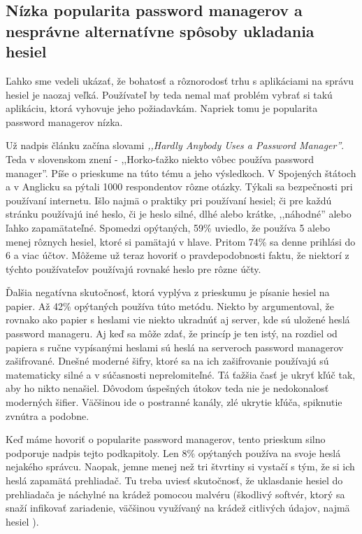 \subsection{Nízka popularita password managerov a nesprávne alternatívne spôsoby ukladania hesiel}
Ľahko sme vedeli ukázať, že bohatosť a rôznorodosť trhu s aplikáciami na správu hesiel je naozaj veľká. Používateľ by teda nemal mať problém vybrať si takú aplikáciu, ktorá vyhovuje jeho požiadavkám. Napriek tomu je popularita password managerov nízka. 
\par Už nadpis článku \cite{19} začína slovami \textit{,,Hardly Anybody Uses a Password Manager''}. Teda v slovenskom znení - ,,Horko-ťažko niekto vôbec používa password manager''. Píše o prieskume na túto tému a jeho výsledkoch. V Spojených štátoch a v Anglicku sa pýtali 1000 respondentov rôzne otázky. Týkali sa bezpečnosti pri používaní internetu. Išlo najmä o praktiky pri používaní hesiel; či pre každú stránku používajú iné heslo, či je heslo silné, dlhé alebo krátke, ,,náhodné'' alebo ľahko zapamätateľné. Spomedzi opýtaných, 59\% uviedlo, že používa 5 alebo menej rôznych hesiel, ktoré si pamätajú v hlave. Pritom 74\% sa denne prihlási do 6 a viac účtov. Môžeme už teraz hovoriť o pravdepodobnosti faktu, že niektorí z týchto používateľov používajú rovnaké heslo pre rôzne účty.
\par Ďalšia negatívna skutočnosť, ktorá vyplýva z prieskumu je písanie hesiel na papier. Až 42\% opýtaných používa túto metódu. Niekto by argumentoval, že rovnako ako papier s heslami vie niekto ukradnúť aj server, kde sú uložené heslá password manageru. Aj keď sa môže zdať, že princíp je ten istý, na rozdiel od papiera s ručne vypísanými heslami sú heslá na serveroch password managerov zašifrované. Dnešné moderné šifry, ktoré sa na ich zašifrovanie používajú sú matematicky silné a v súčasnosti neprelomiteľné. Tá ťažšia časť je ukryť kľúč tak, aby ho nikto nenašiel. Dôvodom úspešných útokov teda nie je nedokonalosť moderných šifier. Väčšinou ide o postranné kanály, zlé ukrytie kľúča, spiknutie zvnútra a podobne.
\par Keď máme hovoriť o popularite password managerov, tento prieskum silno podporuje nadpis tejto podkapitoly. Len 8\% opýtaných používa na svoje heslá nejakého správcu. Naopak, jemne menej než tri štvrtiny si vystačí s tým, že si ich heslá zapamätá prehliadač. Tu treba uviesť skutočnosť, že uklasdanie hesiel do prehliadača je náchylné na krádež pomocou malvéru (škodlivý softvér, ktorý sa snaží infikovať zariadenie, väčšinou využívaný na krádež citlivých údajov, najmä hesiel \cite{20}). 
